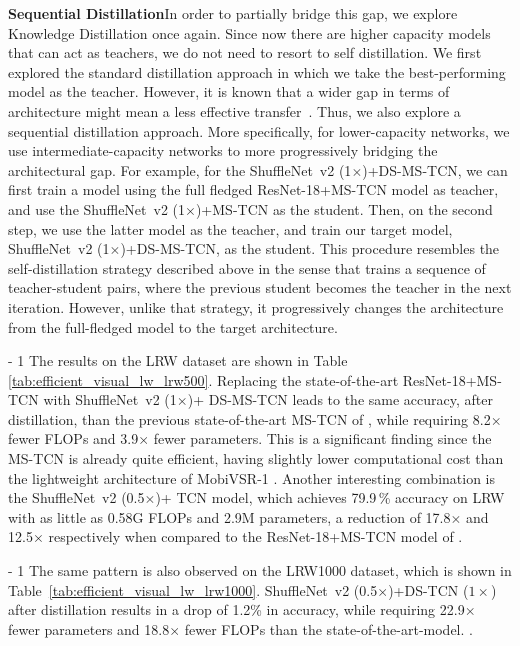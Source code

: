 \documentclass{article}
\begin{document}
\noindent\textbf{Sequential Distillation}\quad In order to partially bridge this gap, we explore Knowledge Distillation once again. Since now there are higher capacity models that can act as teachers, we do not need to resort to self distillation. We first explored the standard distillation approach in which we take the best-performing model as the teacher. However, it is known that a wider gap in terms of architecture might mean a less effective transfer~\cite{search_to_distill_cvpr20,Martinez2020Training}. Thus, we also explore a sequential distillation approach. More specifically, for lower-capacity networks, we use intermediate-capacity networks to more progressively bridging the architectural gap. For example, for the ShuffleNet~v2 (1$\times$)+DS-MS-TCN, we can first train a model using the full fledged ResNet-18+MS-TCN model as teacher, and use the ShuffleNet~v2 (1$\times$)+MS-TCN as the student. Then, on the second step, we use the latter model as the teacher, and train our target model, ShuffleNet~v2 (1$\times$)+DS-MS-TCN, as the student. This procedure resembles the self-distillation strategy described above in the sense that trains a sequence of teacher-student pairs, where the previous student becomes the teacher in the next iteration. However, unlike that strategy, it progressively changes the architecture from the full-fledged model to the target architecture.

\looseness - 1
The results on the LRW dataset are shown in Table \ref{tab:efficient_visual_lw_lrw500}. Replacing the state-of-the-art ResNet-18+MS-TCN with ShuffleNet~v2 (1$\times$)+ DS-MS-TCN leads to the same accuracy, after distillation, than the previous state-of-the-art MS-TCN of \cite{martinez2020lipreading}, while requiring 8.2$\times$ fewer FLOPs and 3.9$\times$ fewer parameters. This is a significant finding since the MS-TCN is already quite efficient, having slightly lower computational cost than the lightweight architecture of MobiVSR-1 \cite{shrivastava2019mobivsr}. Another interesting combination is the ShuffleNet~v2 (0.5$\times$)+ TCN model, which achieves 79.9\,\% accuracy on LRW with as little as 0.58G FLOPs and 2.9M parameters, a reduction of 17.8$\times$ and 12.5$\times$ respectively when compared to the ResNet-18+MS-TCN model of \cite{martinez2020lipreading}.

\looseness - 1
The same pattern is also observed on the LRW1000 dataset, which is shown in Table~\ref{tab:efficient_visual_lw_lrw1000}. ShuffleNet~v2 (0.5$\times$)+DS-TCN ($1\times$) after distillation results in a drop of 1.2\% in accuracy,  while requiring 22.9$\times$ fewer parameters and 18.8$\times$ fewer FLOPs than the state-of-the-art-model. \cite{martinez2020lipreading}.
\end{document}
